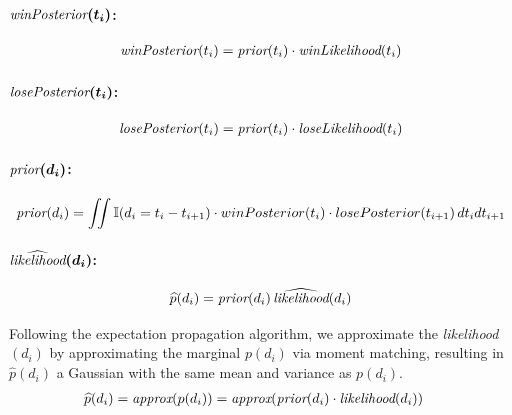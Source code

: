 \documentclass[article]{jss}
\begin{document}
\paragraph{$\bm{\emph{winPosterior}(t_i)}$:}

\begin{equation}
 \begin{split}
  \emph{winPosterior}(t_{i}) = \emph{prior}(t_i) \cdot \emph{winLikelihood}(t_i)
 \end{split}
\end{equation}


\paragraph{$\bm{\emph{losePosterior}(t_i)}$:}

\begin{equation}
 \begin{split}
  \emph{losePosterior}(t_{i}) = \emph{prior}(t_i) \cdot \emph{loseLikelihood}(t_i)
 \end{split}
\end{equation}


\paragraph{$\bm{\emph{prior}(d_i)}$:}

\begin{equation}
 \begin{split}
  \emph{prior}(d_{i}) = \iint \mathbb{I}(d_{i} = t_i - t_{i+1} ) \cdot winPosterior(t_i) \cdot losePosterior(t_{i+1}) \, dt_idt_{i+1} 
 \end{split}
\end{equation}


\paragraph{$\bm{\widehat{\emph{likelihood}}(d_i)}$:}

\begin{equation}
\widehat{p}(d_i) = \emph{prior}(d_i) \, \widehat{\emph{likelihood}}(d_i)
\end{equation}

Following the expectation propagation algorithm, we approximate the \emph{likelihood}$(d_i)$ by approximating the marginal $p(d_i)$ via moment matching, resulting in $\widehat{p}(d_i)$ a Gaussian with the same mean and variance as $p(d_i)$.
\begin{equation}
\begin{split}
 \widehat{p}(d_i) & = \emph{approx}(p(d_i)) = \emph{approx}(\emph{prior}(d_i) \cdot \emph{likelihood}(d_i)) 
 \end{split}
\end{equation}
\end{document}
